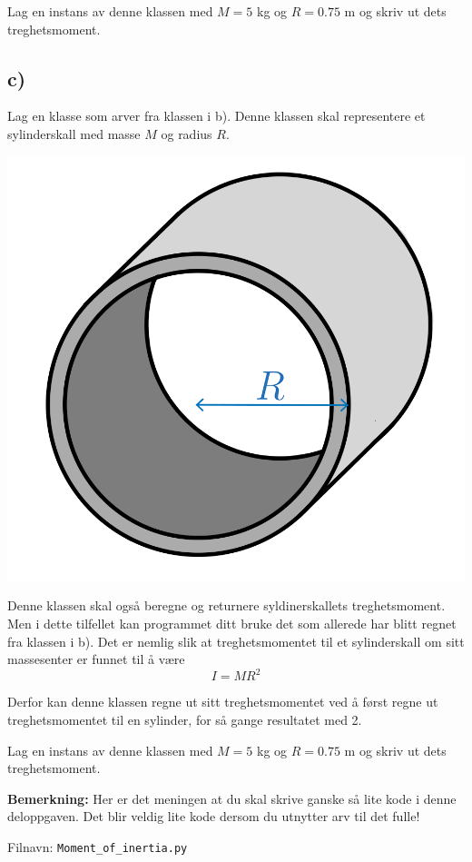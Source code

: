 \documentclass[10pt,a4paper]{article}
\begin{document}
Lag en instans av denne klassen med $M = 5$ kg og $R = 0.75$ m og skriv ut dets treghetsmoment.
\subsection*{c)}
Lag en klasse som arver fra klassen i b). Denne klassen skal representere et sylinderskall med masse $M$ og radius $R$. 
 
\begin{center}
\includegraphics[scale=.5]{fig_sylinderskall-cp1.png}
\end{center}
 
Denne klassen skal også beregne og returnere syldinerskallets treghetsmoment. Men i dette tilfellet kan programmet ditt bruke det som allerede har blitt regnet fra klassen i b). Det er nemlig slik at treghetsmomentet til et sylinderskall om sitt massesenter er funnet til å være
\[
I = MR^2
\]
 
Derfor kan denne klassen regne ut sitt treghetsmomentet ved å først regne ut treghetsmomentet til en sylinder, for så gange resultatet med 2. 
 
Lag en instans av denne klassen med $M = 5$ kg og $R = 0.75$ m og skriv ut dets treghetsmoment.
 
\textbf{Bemerkning: } Her er det meningen at du skal skrive ganske så lite kode i denne deloppgaven. Det blir veldig lite kode dersom du utnytter arv til det fulle! 
 
Filnavn: \texttt{Moment\_of\_inertia.py}
\end{document}
